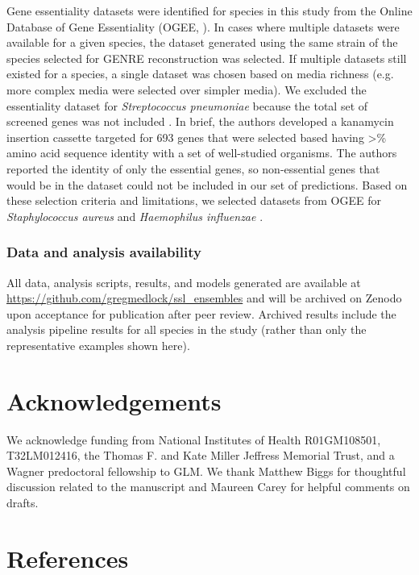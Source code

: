 \documentclass[11pt,onecolumn,notitlepage,openany,twoside]{book}
\begin{document}
\begin{refsection}
Gene essentiality datasets were identified for species in this study from the Online Database of Gene Essentiality (OGEE, \cite{Chen2017-cs}). In cases where multiple datasets were available for a given species, the dataset generated using the same strain of the species selected for GENRE reconstruction was selected. If multiple datasets still existed for a species, a single dataset was chosen based on media richness (e.g. more complex media were selected over simpler media). We excluded the essentiality dataset for \textit{Streptococcus pneumoniae} because the total set of screened genes was not included \cite{Song2005-uc}. In brief, the authors developed a kanamycin insertion cassette targeted for 693 genes that were selected based having \textgreater{}\% amino acid sequence identity with a set of well-studied organisms. The authors reported the identity of only the essential genes, so non-essential genes that would be in the dataset could not be included in our set of predictions. Based on these selection criteria and limitations, we selected datasets from OGEE for \textit{Staphylococcus aureus} \cite{Chaudhuri2009-za} and \textit{Haemophilus influenzae} \cite{Akerley2002-ja}.

\subsubsection{Data and analysis availability}

All data, analysis scripts, results, and models generated are available at \url{https://github.com/gregmedlock/ssl_ensembles} and will be archived on Zenodo upon acceptance for publication after peer review. Archived results include the analysis pipeline results for all species in the study (rather than only the representative examples shown here).

\section{Acknowledgements}

We acknowledge funding from National Institutes of Health R01GM108501, T32LM012416, the Thomas F. and Kate Miller Jeffress Memorial Trust, and a Wagner predoctoral fellowship to GLM. We thank Matthew Biggs for thoughtful discussion related to the manuscript and Maureen Carey for helpful comments on drafts.

\section{References}


\end{refsection}
\end{document}
